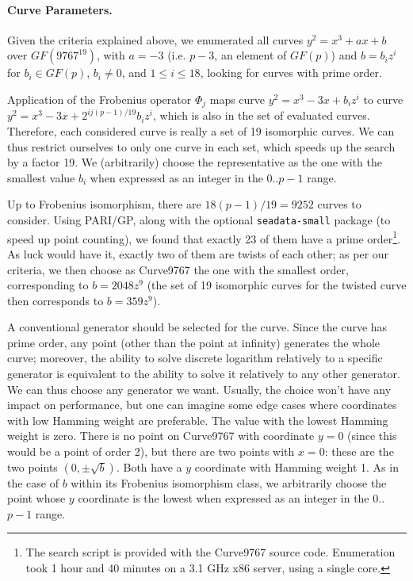 \documentclass{llncs}
\newcommand{\GF}{GF}
\begin{document}
\paragraph{Curve Parameters.}

Given the criteria explained above, we enumerated all curves $y^2 = x^3+ax+b$
over $\GF(9767^{19})$, with $a = -3$ (i.e. $p-3$, an element of $\GF(p)$)
and $b = b_i z^i$ for $b_i \in \GF(p)$, $b_i \neq 0$, and $1\leq i\leq 18$,
looking for curves with prime order.

Application of the Frobenius operator $\Phi_j$ maps curve $y^2 = x^3 -
3x + b_i z^i$ to curve $y^2 = x^3 - 3x + 2^{ij(p-1)/19} b_i z^i$, which
is also in the set of evaluated curves. Therefore, each considered curve
is really a set of 19 isomorphic curves. We can thus restrict ourselves
to only one curve in each set, which speeds up the search by a factor
19. We (arbitrarily) choose the representative as the one with the
smallest value $b_i$ when expressed as an integer in the $0..p-1$ range.

Up to Frobenius isomorphism, there are $18(p-1)/19 = 9252$ curves to
consider. Using PARI/GP\cite{PARIGP}, along with the optional
\verb+seadata-small+ package (to speed up point counting), we found that
exactly 23 of them have a prime order\footnote{The search script is
provided with the Curve9767 source code. Enumeration took 1 hour and 40
minutes on a 3.1 GHz x86 server, using a single core.}. As luck would
have it, exactly two of them are twists of each other; as per our
criteria, we then choose as Curve9767 the one with the smallest order,
corresponding to $b = 2048z^9$ (the set of 19 isomorphic curves for
the twisted curve then corresponds to $b = 359z^9$).

A conventional generator should be selected for the curve. Since the
curve has prime order, any point (other than the point at infinity)
generates the whole curve; moreover, the ability to solve discrete
logarithm relatively to a specific generator is equivalent to the
ability to solve it relatively to any other generator. We can thus
choose any generator we want. Usually, the choice won't have any impact
on performance, but one can imagine some edge cases where coordinates
with low Hamming weight are preferable. The value with the lowest
Hamming weight is zero. There is no point on Curve9767 with coordinate
$y = 0$ (since this would be a point of order 2), but there are two
points with $x = 0$: these are the two points $(0,\pm\sqrt{b})$. Both
have a $y$ coordinate with Hamming weight 1. As in the case of $b$
within its Frobenius isomorphism class, we arbitrarily choose the point
whose $y$ coordinate is the lowest when expressed as an integer in the
$0$..$p-1$ range.
\end{document}
